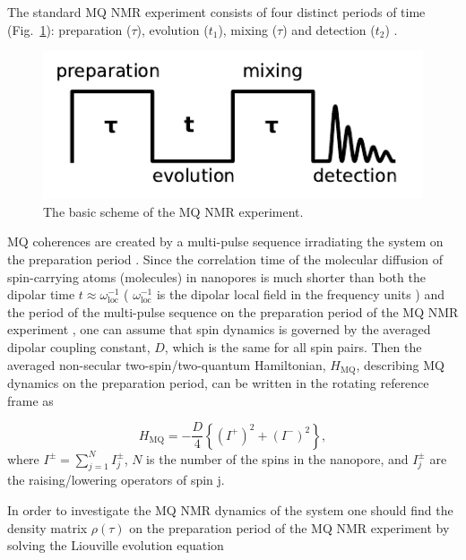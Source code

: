 \documentclass[%
 reprint,
superscriptaddress,
 amsmath,amssymb,
]{revtex4-2}
\begin{document}
The standard MQ NMR experiment consists of four distinct periods of time (Fig.~\ref{fig:experiment}): preparation ($\tau$), evolution ($t_1$), mixing ($\tau$) and detection ($t_2$) \cite{mq_nmr_experiment}.
\begin{figure}
    \centering
    \includegraphics[width=\linewidth]{experiment.pdf}
    \caption{The basic scheme of the MQ NMR experiment.}
    \label{fig:experiment}
\end{figure}
MQ coherences are created by a multi-pulse sequence irradiating the system on the preparation period \cite{mq_nmr_experiment}. Since the correlation time of the molecular diffusion of spin-carrying atoms (molecules) in nanopores is much shorter than both the dipolar time $t \approx \omega^{-1}_{\mathrm{loc}}$ ( $\omega^{-1}_{\mathrm{loc}}$  is the dipolar local field in the frequency units \cite{Goldman}) and  the period of the multi-pulse sequence on the preparation period of the MQ NMR experiment \cite{mq_nmr_experiment}, one can assume that spin dynamics is governed by the averaged dipolar coupling constant, $D$, which is the same for all spin pairs. Then the averaged non-secular two-spin/two-quantum Hamiltonian, $H_\mathrm{MQ}$, describing MQ dynamics on the preparation period, can be written in the rotating reference frame \cite{Goldman} as \cite{lab:mq_nmr_dyn_in_nanopores_2009}

\begin{equation}
    \label{eq:ham_mq}
    H_\mathrm{MQ}  = - \frac D 4 \left\{(I^+)^2 + (I^-)^2\right\},
\end{equation}
where  $I^{\pm} = \sum\limits_{j=1}^N I^{\pm}_j$, $N$ is the number of the spins in the nanopore, and $I^{\pm}_j$ are the raising/lowering operators of spin j.

In order to investigate the MQ NMR dynamics of the system one should find the density matrix $\rho(\tau)$ on the preparation period of the MQ NMR experiment \cite{mq_nmr_experiment} by solving the Liouville evolution equation \cite{lab:mq_mnr_qinfo_2012}
\end{document}
